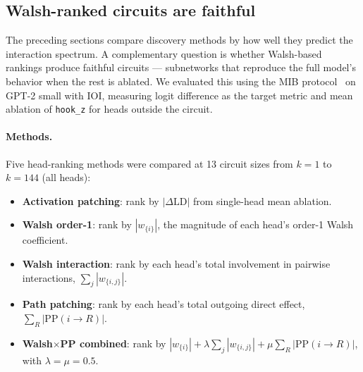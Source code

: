 %
%

\subsection{Walsh-ranked circuits are faithful}
\label{sec:mib-benchmark}

The preceding sections compare discovery methods by how well they
predict the interaction spectrum. A complementary question is whether
Walsh-based rankings produce faithful circuits ---
subnetworks that reproduce the full model's behavior when the rest is
ablated. We evaluated this using the MIB
protocol~\citep{mueller2025mib} on GPT-2 small with IOI, measuring
logit difference as the target metric and mean ablation of
\texttt{hook\_z} for heads outside the circuit.

\paragraph{Methods.}

Five head-ranking methods were compared at 13 circuit sizes from
$k = 1$ to $k = 144$ (all heads):

\begin{itemize}
\item \textbf{Activation patching}: rank by $|\Delta\text{LD}|$ from
  single-head mean ablation.
\item \textbf{Walsh order-1}: rank by $|w_{\{i\}}|$, the magnitude of
  each head's order-1 Walsh coefficient.
\item \textbf{Walsh interaction}: rank by each head's total involvement
  in pairwise interactions, $\sum_j |w_{\{i,j\}}|$.
\item \textbf{Path patching}: rank by each head's total outgoing direct
  effect, $\sum_R |\text{PP}(i \to R)|$.
\item \textbf{Walsh$\times$PP combined}: rank by $|w_{\{i\}}| +
  \lambda\sum_j |w_{\{i,j\}}| + \mu\sum_R |\text{PP}(i \to R)|$, with
  $\lambda = \mu = 0.5$.
\end{itemize}

